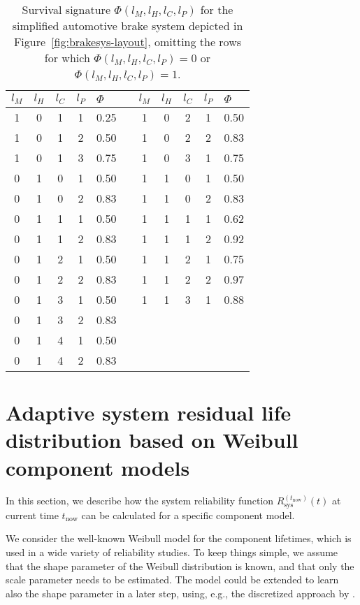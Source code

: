 \documentclass[authoryear]{elsarticle}
\def\tnow{t_\text{now}}
\newcommand{\Rsysnow}{R^{(t_\text{now})}_\text{sys}}
\begin{document}
\begin{table}
\centering
\begin{tabular}{cccclcccccl}
  \toprule
$l_M$ & $l_H$ & $l_C$ & $l_P$ & $\Phi$ & \quad & $l_M$ & $l_H$ & $l_C$ & $l_P$ & $\Phi$\\ 
  \midrule
1 & 0 & 1 & 1 & 0.25 & & 1 & 0 & 2 & 1 & 0.50 \\ 
1 & 0 & 1 & 2 & 0.50 & & 1 & 0 & 2 & 2 & 0.83 \\ 
1 & 0 & 1 & 3 & 0.75 & & 1 & 0 & 3 & 1 & 0.75 \\ 
0 & 1 & 0 & 1 & 0.50 & & 1 & 1 & 0 & 1 & 0.50 \\ 
0 & 1 & 0 & 2 & 0.83 & & 1 & 1 & 0 & 2 & 0.83 \\ 
0 & 1 & 1 & 1 & 0.50 & & 1 & 1 & 1 & 1 & 0.62 \\ 
0 & 1 & 1 & 2 & 0.83 & & 1 & 1 & 1 & 2 & 0.92 \\ 
0 & 1 & 2 & 1 & 0.50 & & 1 & 1 & 2 & 1 & 0.75 \\ 
0 & 1 & 2 & 2 & 0.83 & & 1 & 1 & 2 & 2 & 0.97 \\ 
0 & 1 & 3 & 1 & 0.50 & & 1 & 1 & 3 & 1 & 0.88 \\ 
0 & 1 & 3 & 2 & 0.83 \\
0 & 1 & 4 & 1 & 0.50 \\
0 & 1 & 4 & 2 & 0.83 \\
   \bottomrule
\end{tabular}
\caption{Survival signature $\Phi(l_M, l_H, l_C, l_P)$
for the simplified automotive brake system depicted in Figure~\ref{fig:brakesys-layout},
omitting the rows for which $\Phi(l_M, l_H, l_C, l_P) = 0$ or $\Phi(l_M, l_H, l_C, l_P) = 1$.}
\label{tab:brakesys-survsign}
\end{table}


\section{Adaptive system residual life distribution based on Weibull component models}
\label{sec:adaptive-sysrel-weibull}

In this section, we describe how the system reliability function $\Rsysnow(t)$ at current time $\tnow$ 
can be calculated for a specific component model.

We consider the well-known Weibull model for the component lifetimes,
which is used in a wide variety of reliability studies. 
To keep things simple, we assume that the shape parameter of the Weibull distribution is known,
and that only the scale parameter needs to be estimated.
The model could be extended to learn also the shape parameter in a later step,
using, e.g., the discretized approach by \cite{1969:soland}.
\end{document}
